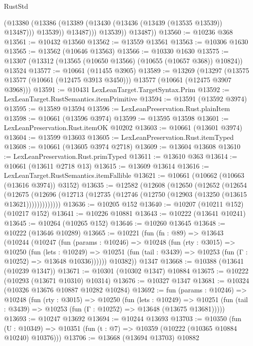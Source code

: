 \begin{lexlean}{RustStd}
\begin{coremodule}
                  (@13380
                    (@13386 (@13389 (@13430 (@13436 (@13439 (@13535 @13539)) @13487))) @13539))
                  @13487)))
            @13539))
        @13487))
@13560 := @10236 @368
@13561 := @10432 @13560
@13562 := @13559 @13561
@13563 := @10306 @1630
@13565 := @13562 (@10646 @13563)
@13566 := @10330 @1630
@13575 := @13307 (@13312 (@13565 (@10650 @13566) (@10655 (@10657 @368)) @10824)) @13524
@13577 := @10661 (@11455 @3905)
@13589 := @13269
    (@13297 (@13575 @13577 (@10661 (@12475 @3913 @3450))) @13577 (@10661 (@12475 @3907 @3968)))
@13591 := @10431 LexLeanTarget.TargetSyntax.Prim
@13592 := LexLeanTarget.RustSemantics.itemPrimitive
@13594 := @13591 (@13592 @3974)
@13595 := @13589 @13594
@13596 := LexLeanPreservation.Rust.plainItem
@13598 := @10661 (@13596 @3974)
@13599 := @13595 @13598
@13601 := LexLeanPreservation.Rust.itemOK @10202
@13603 := @10661 (@13601 @3974)
@13604 := @13599 @13603
@13605 := LexLeanPreservation.Rust.itemTyped
@13608 := @10661 (@13605 @3974 @2718)
@13609 := @13604 @13608
@13610 := LexLeanPreservation.Rust.primTyped
@13611 := @13610 @363
@13614 := @10661 (@13611 @2718 @13)
@13615 := @13609 @13614
@13616 := LexLeanTarget.RustSemantics.itemFallible
@13621 := @10661 (@10662 (@10663 (@13616 @3974)) @3152)
@13635 := @12582
    (@12608
      (@12650
        (@12652
          (@12654
            (@12675
              (@12696 (@12713 (@12735 (@12746 (@12750 (@12903 (@13250 (@13615 @13621)))))))))))))
@13636 := @10205 @152
@13640 := @10207 (@10211 @152) (@10217 @152)
@13641 := @10226 @10881
@13643 := @10222 (@13641 @10241)
@13645 := @10264 (@10265 @152)
@13646 := @10260 @13645
@13648 := @10222 (@13646 @10289)
@13665 := @10221
    (fun (fn : @89) =>
    @13643
      (@10244
        (@10247
          (fun (params : @10246) =>
          @10248
            (fun (rty : @3015) =>
            @10250
              (fun (lets : @10249) =>
              @10251 (fun (tail : @3439) => @10253 (fun (Γ : @10252) => @13648 @10336))))))
        @10382))
    @1347
@13668 := @10388 (@13641 (@10239 @1347))
@13671 := @10301 (@10302 @1347) @10884
@13675 := @10222 (@10293 (@13671 @10310) @10314)
@13676 := @10327 @1347
@13681 := @10324 (@10326 @13676 @10887 @10282 @10284)
@13692 := fun (params : @10246) =>
  @10248
    (fun (rty : @3015) =>
    @10250
      (fun (lets : @10249) =>
      @10251 (fun (tail : @3439) => @10253 (fun (Γ : @10252) => @13648 (@13675 @13681)))))
@13693 := @10247 @13692
@13694 := @10244 @13693
@13703 := @10350
    (fun (U : @10349) => @10351 (fun (t : @7) => @10359 (@10222 (@10365 @10884 @10240) @10376)))
@13706 := @13668 (@13694 @13703) @10882

\end{coremodule}
\end{lexlean}
